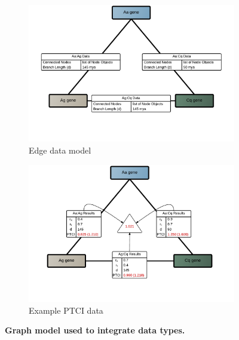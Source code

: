 \begin{figure}[hp]
\begin{subfigure}[t]{.5\linewidth}
    \includegraphics[width=\linewidth]{figures/figs/gfunc_graph_figs/ortho-graph-edge-data.pdf}
    \caption{Edge data model}\label{fig:nway-ortholog-graph-edge-data}
    \end{subfigure}%
% 
% 
%     
    \begin{subfigure}[t]{.5\linewidth}
    \centering
    \includegraphics[width=\linewidth]{figures/figs/gfunc_graph_figs/ortho-graph-ptci.pdf}
    \caption{Example PTCI data}\label{fig:nway-ortholog-graph-ptci}
    \end{subfigure}
% 
% 
% 
\caption[Graph model used to integrate data types]{\sf \textbf{Graph model used to integrate data types.}}\label{fig:nway-ortholog-graph}
\end{figure}